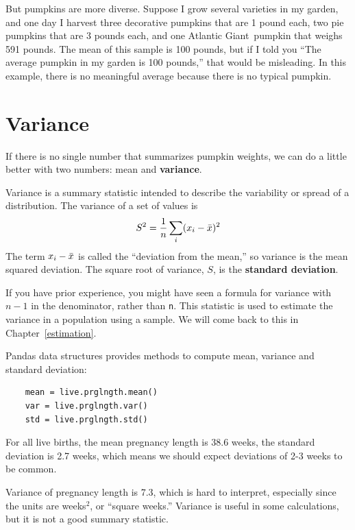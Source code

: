 \documentclass[12pt]{book}
\begin{document}
But pumpkins are more diverse.  Suppose I grow several varieties in my
garden, and one day I harvest three decorative pumpkins that are 1
pound each, two pie pumpkins that are 3 pounds each, and one Atlantic
Giant\textregistered~pumpkin that weighs 591 pounds.  The mean of this
sample is 100 pounds, but if I told you ``The average pumpkin in my
garden is 100 pounds,'' that would be misleading.  In this example,
there is no meaningful average because there is no typical pumpkin.



\section{Variance}

If there is no single number that summarizes pumpkin weights,
we can do a little better with two numbers: mean and {\bf variance}.

Variance is a summary statistic intended to describe the variability
or spread of a distribution.  The variance of a set of values is
%
\[ S^2 = \frac{1}{n} \sum_i (x_i - \bar{x})^2 \]
%
The term $x_i - \bar{x}$ is called the ``deviation from the mean,'' so
variance is the mean squared deviation.  The square root of variance,
$S$, is the {\bf standard deviation}.  

If you have prior experience, you might have seen a formula for
variance with $n-1$ in the denominator, rather than {\tt n}.  This
statistic is used to estimate the variance in a population using a
sample.  We will come back to this in Chapter~\ref{estimation}.

Pandas data structures provides methods to compute mean, variance and
standard deviation:

\begin{verbatim}
    mean = live.prglngth.mean()
    var = live.prglngth.var()
    std = live.prglngth.std()
\end{verbatim}

For all live births, the mean pregnancy length is 38.6 weeks, the
standard deviation is 2.7 weeks, which means we should expect
deviations of 2-3 weeks to be common.

Variance of pregnancy length is 7.3, which is hard to interpret,
especially since the units are weeks$^2$, or ``square weeks.''
Variance is useful in some calculations, but it is not
a good summary statistic.
\end{document}
